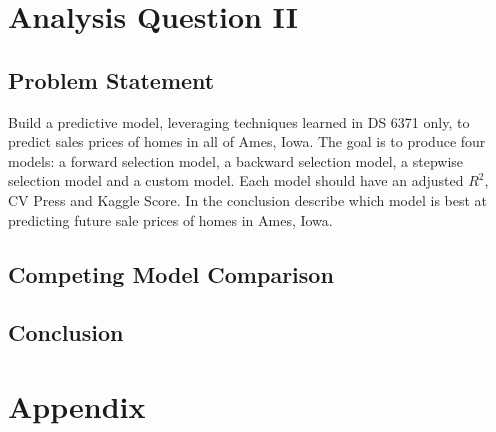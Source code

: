 \documentclass[american,]{article}
\begin{document}
\section{Analysis Question II}\label{analysis-question-ii}

\subsection{Problem Statement}\label{problem-statement-1}

Build a predictive model, leveraging techniques learned in DS 6371 only,
to predict sales prices of homes in all of Ames, Iowa. The goal is to
produce four models: a forward selection model, a backward selection
model, a stepwise selection model and a custom model. Each model should
have an adjusted \(R^{2}\), CV Press and Kaggle Score. In the conclusion
describe which model is best at predicting future sale prices of homes
in Ames, Iowa.

\subsection{Competing Model
Comparison}\label{competing-model-comparison}

\subsection{Conclusion}\label{conclusion}

\citet{Hastie2009} \citet{Trefethen1997}

\section{Appendix}\label{appendix}

\renewcommand\refname{References}

\end{document}
